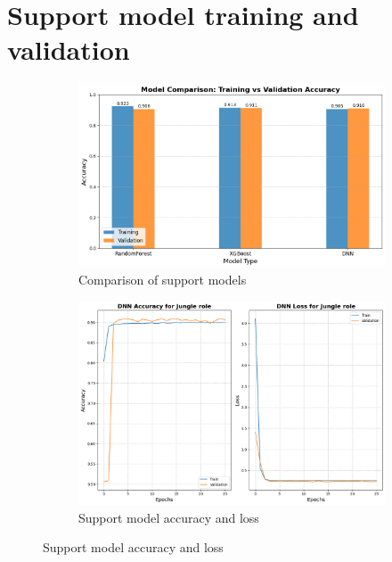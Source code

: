 \documentclass[12pt, a4paper]{article}
\begin{document}
\section{Support model training and validation}\label{sec:support_model_training}
\begin{figure}[!ht]
    \centering
    \begin{subfigure}[b]{0.8\textwidth}
        \centering
        \includegraphics[width=\textwidth]{figures/2_support_model_comparison.png}
        \caption{Comparison of support models}
    \end{subfigure}
    \begin{subfigure}[b]{0.8\textwidth}
        \centering
        \includegraphics[width=\textwidth]{figures/2_support_model_acc_loss.png}
        \caption{Support model accuracy and loss}
    \end{subfigure}
\end{figure}
\end{document}
